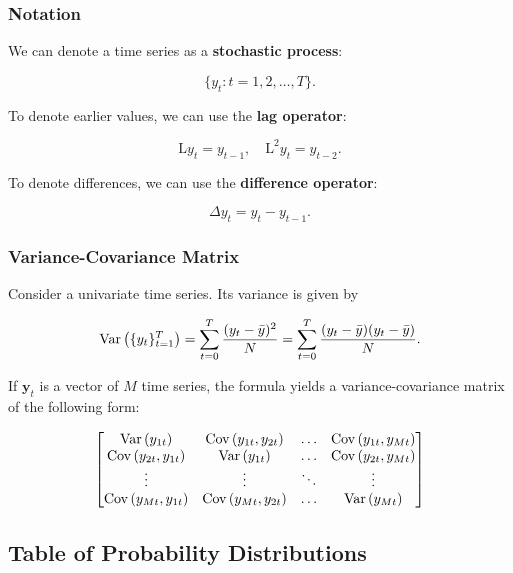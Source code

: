 \subsubsection{Notation}

We can denote a time series as a \textbf{stochastic process}:

\[
	\{y_t:t=1,2,\dots,T\}.
\]

To denote earlier values, we can use the \textbf{lag operator}:

\[
	\mathrm{L}y_t = y_{t-1}, \quad\mathrm{L}^2y_t = y_{t-2}. 
\]

To denote differences, we can use the \textbf{difference operator}:

\[
	\Delta y_t = y_t-y_{t-1}.
\]

\subsubsection{Variance-Covariance Matrix}

Consider a univariate time series. Its variance is given by

\begin{equation}
	\mathrm{Var}\left({\{y_t\}_{t=1}^T}\right) = \sum^T_{t=0}\frac{(y_t-\bar{y})^2}{N} = \sum^T_{t=0}\frac{(y_t-\bar{y})(y_t-\bar{y})}{N}.
\end{equation}

If $\bm{y}_t$ is a vector of $M$ time series, the formula yields a variance-covariance matrix of the following form:

\begin{equation}
	\begin{bmatrix}
		\mathrm{Var}\left({y_{1t}}\right) & \mathrm{Cov}\left({y_{1t},y_{2t}}\right) & \dots & \mathrm{Cov}\left({y_{1t},y_{Mt}}\right) \\
		\mathrm{Cov}\left({y_{2t},y_{1t}}\right) & \mathrm{Var}\left({y_{1t}}\right) & \dots & \mathrm{Cov}\left({y_{2t},y_{Mt}}\right) \\
		\vdots & \vdots & \ddots & \vdots \\
		\mathrm{Cov}\left({y_{Mt},y_{1t}}\right) & \mathrm{Cov}\left({y_{Mt},y_{2t}}\right) & \dots & \mathrm{Var}\left({y_{Mt}}\right)
	\end{bmatrix}
\end{equation}

\subsection{Table of Probability Distributions}

